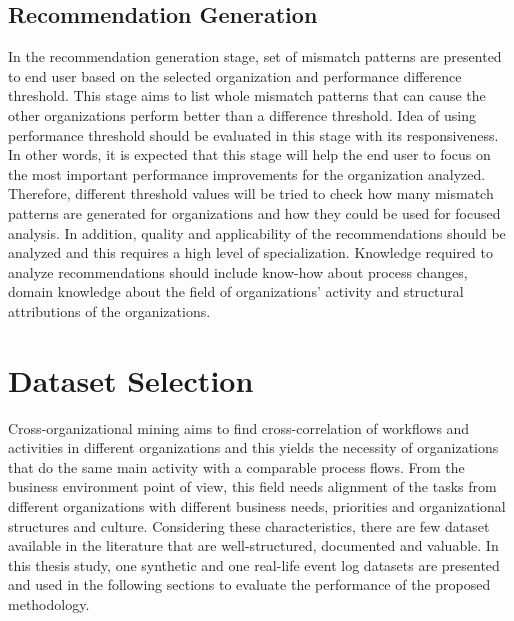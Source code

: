 \subsection{Recommendation Generation}
\label{subsec:recommendation-generation-eval}
In the recommendation generation stage, set of mismatch patterns are presented to end user based on the selected organization and performance difference threshold. This stage aims to list whole mismatch patterns that can cause the other organizations perform better than a difference threshold. Idea of using performance threshold should be evaluated in this stage with its responsiveness. In other words, it is expected that this stage will help the end user to focus on the most important performance improvements for the organization analyzed. Therefore, different threshold values will be tried to check how many mismatch patterns are generated for organizations and how they could be used for focused analysis. In addition, quality and applicability of the recommendations should be analyzed and this requires a high level of specialization. Knowledge required to analyze recommendations should include know-how about process changes, domain knowledge about the field of organizations' activity and structural attributions of the organizations.

\section{Dataset Selection}
\label{sec:dataset-selection}
Cross-organizational mining aims to find cross-correlation of workflows and activities in different organizations and this yields the necessity of organizations that do the same main activity with a comparable process flows. From the business environment point of view, this field needs alignment of the tasks from different organizations with different business needs, priorities and organizational structures and culture. Considering these characteristics, there are few dataset available in the literature that are well-structured, documented and valuable. In this thesis study, one synthetic and one real-life event log datasets are presented and used in the following sections to evaluate the performance of the proposed methodology.

